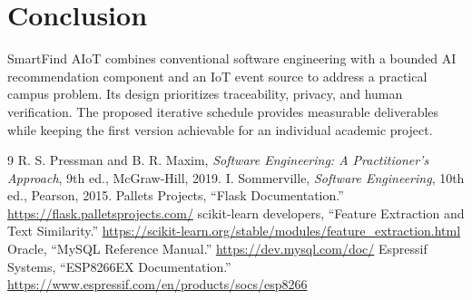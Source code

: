 \documentclass[12pt,a4paper]{report}
\begin{document}
\chapter{Conclusion}
SmartFind AIoT combines conventional software engineering with a bounded AI recommendation component and an IoT event source to address a practical campus problem. Its design prioritizes traceability, privacy, and human verification. The proposed iterative schedule provides measurable deliverables while keeping the first version achievable for an individual academic project.

\begin{thebibliography}{9}
 R. S. Pressman and B. R. Maxim, \textit{Software Engineering: A Practitioner's Approach}, 9th ed., McGraw-Hill, 2019.
 I. Sommerville, \textit{Software Engineering}, 10th ed., Pearson, 2015.
 Pallets Projects, ``Flask Documentation.'' \url{https://flask.palletsprojects.com/}
 scikit-learn developers, ``Feature Extraction and Text Similarity.'' \url{https://scikit-learn.org/stable/modules/feature_extraction.html}
 Oracle, ``MySQL Reference Manual.'' \url{https://dev.mysql.com/doc/}
 Espressif Systems, ``ESP8266EX Documentation.'' \url{https://www.espressif.com/en/products/socs/esp8266}
\end{thebibliography}
\end{document}
